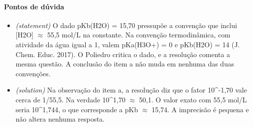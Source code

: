 \documentclass{article}%
\begin{document}
\paragraph{Pontos de dúvida}%
\begin{itemize}%
\item%
\textit{(statement)} O dado pKb(H2O) = 15,70 pressupõe a convenção que inclui {[}H2O{]} $\approx$ 55,5 mol/L na constante. Na convenção termodinâmica, com atividade da água igual a 1, valem pKa(H3O+) = 0 e pKb(H2O) = 14 (J. Chem. Educ. 2017). O Poliedro critica o dado, e a resolução comenta a mesma questão. A conclusão do item a não muda em nenhuma das duas convenções.%
\item%
\textit{(solution)} Na observação do item a, a resolução diz que o fator 10\^{}-1,70 vale cerca de 1/55,5. Na verdade 10\^{}1,70 $\approx$ 50,1. O valor exato com 55,5 mol/L seria 10\^{}1,744, o que corresponde a pKb $\approx$ 15,74. A imprecisão é pequena e não altera nenhuma resposta.%
\end{itemize}%
\end{document}

